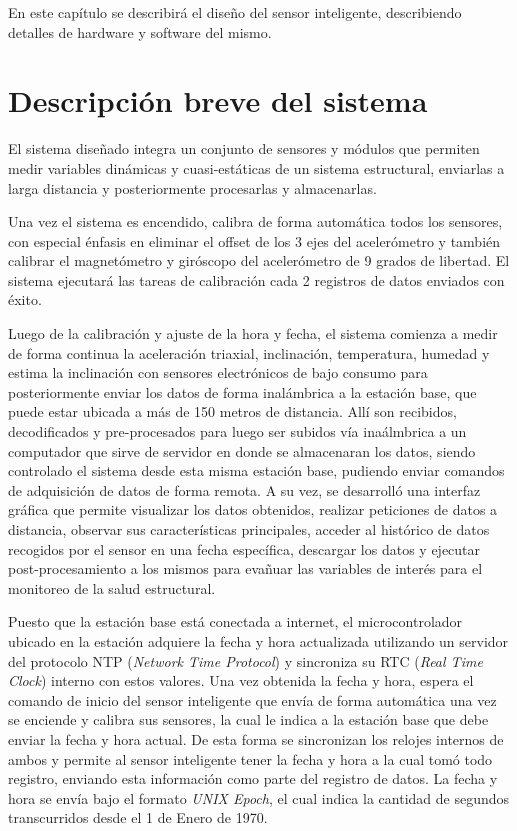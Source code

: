 En este capítulo se describirá el diseño del sensor inteligente, describiendo detalles de hardware y software del mismo.

\section{Descripción breve del sistema}
\label{subsec:descpsist}

El sistema diseñado integra un conjunto de sensores y módulos que permiten medir variables dinámicas y cuasi-estáticas de un sistema estructural, enviarlas a larga distancia y posteriormente procesarlas y almacenarlas.

Una vez el sistema es encendido, calibra de forma automática todos los sensores, con especial énfasis en eliminar el offset de los 3 ejes del acelerómetro y también calibrar el magnetómetro y giróscopo del acelerómetro de 9 grados de libertad. El sistema ejecutará las tareas de calibración cada 2 registros de datos enviados con éxito.

Luego de la calibración y ajuste de la hora y fecha,  el sistema comienza a medir de forma continua la aceleración triaxial, inclinación, temperatura, humedad y estima la inclinación con sensores electrónicos de bajo consumo para posteriormente enviar los datos de forma inalámbrica a la estación base, que puede estar ubicada a más de 150 metros de distancia. Allí son recibidos, decodificados y pre-procesados para luego ser subidos vía inaálmbrica a un computador que sirve de servidor en donde se almacenaran los datos, siendo controlado el sistema desde esta misma estación base, pudiendo enviar comandos de adquisición de datos de forma remota. A su vez, se desarrolló una interfaz gráfica que permite visualizar los datos obtenidos, realizar peticiones de datos a distancia, observar sus características principales, acceder al histórico de datos recogidos por el sensor en una fecha específica, descargar los datos y ejecutar post-procesamiento a los mismos para evañuar las variables de interés para el monitoreo de la salud estructural.

Puesto que la estación base está conectada a internet, el microcontrolador ubicado en la estación adquiere la fecha y hora actualizada utilizando un servidor del protocolo NTP (\textit{Network Time Protocol}) y sincroniza su RTC (\textit{Real Time Clock}) interno con estos valores. Una vez obtenida la fecha y hora, espera el comando de inicio del sensor inteligente que envía de forma automática una vez se enciende y calibra sus sensores, la cual le indica a la estación base que debe enviar la fecha y hora actual. De esta forma se sincronizan los relojes internos de ambos y permite al sensor inteligente tener la fecha y hora a la cual tomó todo registro, enviando esta información como parte del registro de datos. La fecha y hora se envía bajo el formato \textit{UNIX Epoch}, el cual indica la cantidad de segundos transcurridos desde el 1 de Enero de 1970.
	
